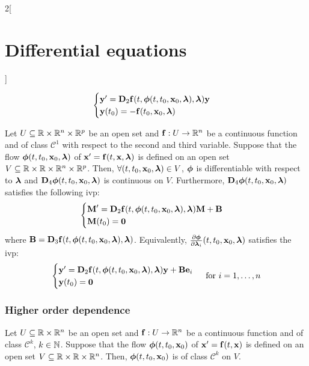\documentclass[../../../main_math.tex]{subfiles}
\begin{document}
\begin{multicols}{2}[\section{Differential equations}]
\begin{theorem}[Dependence on $t_0$]
    \begin{equation*}
      \begin{cases}
        \vf{y}'      =\vf{D}_2\vf{f}(t,\vf{\phi}(t,t_0,\vf{x}_0,\vf{\lambda}),\vf{\lambda})\vf{y} \\
        \vf{y}(t_0)  = -\vf{f}(t_0,\vf{x}_0,\vf{\lambda})
      \end{cases}
    \end{equation*}
  \end{theorem}
  \begin{theorem}
    Let $U\subseteq\RR\times\RR^n\times\RR^p$ be an open set and $\vf{f}:U\rightarrow\RR^n$ be a continuous function and of class $\mathcal{C}^1$ with respect to the second and third variable. Suppose that the flow $\vf{\phi}(t,t_0,\vf{x}_0,\vf{\lambda})$ of $\vf{x}'=\vf{f}(t,\vf{x},\vf{\lambda})$ is defined on an open set $V\subseteq\RR\times\RR\times\RR^n\times\RR^p$. Then, $\forall (t,t_0,\vf{x}_0,\vf{\lambda})\in V$, $\vf{\phi}$ is differentiable with respect to $\vf{\lambda}$ and $\vf{D}_4\vf{\phi}(t,t_0,\vf{x}_0,\vf{\lambda})$ is continuous on $V$. Furthermore, $\vf{D}_4\vf{\phi}(t,t_0,\vf{x}_0,\vf{\lambda})$ satisfies the following ivp:
    \begin{equation*}
      \begin{cases}
        \vf{M}'      =\vf{D}_2\vf{f}(t,\vf{\phi}(t,t_0,\vf{x}_0,\vf{\lambda}),\vf{\lambda})\vf{M}+ \vf{B} \\
        \vf{M}(t_0)  =\vf{0}
      \end{cases}
    \end{equation*}
    where $\vf{B}=\vf{D}_3\vf{f}(t,\vf{\phi}(t,t_0,\vf{x}_0,\vf{\lambda}),\vf{\lambda})$. Equivalently, $\frac{\partial\vf{\phi}}{\partial \vf{\lambda}_i}(t,t_0,\vf{x}_0,\vf{\lambda})$ satisfies the ivp:
    $$
      \begin{cases}
        \vf{y}'      =\vf{D}_2\vf{f}(t,\vf{\phi}(t,t_0,\vf{x}_0,\vf{\lambda}),\vf{\lambda})\vf{y}+\vf{B}\vf{e}_i \\
        \vf{y}(t_0)  =\vf{0}
      \end{cases}\;\text{for }i=1,\ldots,n
    $$
  \end{theorem}
  \subsubsection{Higher order dependence}
  \begin{theorem}
    Let $U\subseteq\RR\times\RR^n$ be an open set and $\vf{f}:U\rightarrow\RR^n$ be a continuous function and of class $\mathcal{C}^k$, $k\in\NN$. Suppose that the flow $\vf{\phi}(t,t_0,\vf{x}_0)$ of $\vf{x}'=\vf{f}(t,\vf{x})$ is defined on an open set $V\subseteq\RR\times\RR\times\RR^n$. Then, $\vf{\phi}(t,t_0,\vf{x}_0)$ is of class $\mathcal{C}^k$ on $V$.
  \end{theorem}

\end{multicols}
\end{document}
